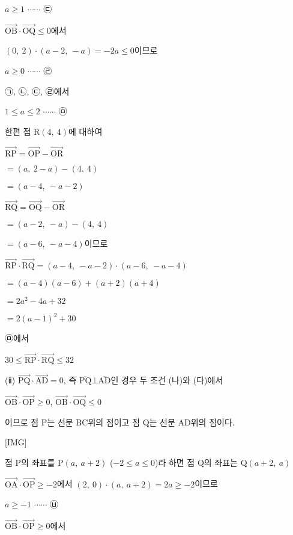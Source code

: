 \documentclass{oblivoir}
\begin{document}
$a\ge 1$ $\cdots\cdots$ ㉢

$\overrightarrow{\mathrm{OB}}\cdot\overrightarrow{\mathrm{OQ}}\le 0$에서 

$(0,\:2)\cdot(a-2,\:  - a)= -2a\le 0$이므로

$a\ge 0$ $\cdots\cdots$ ㉣

㉠, ㉡, ㉢, ㉣에서 

$1\le a\le 2$ $\cdots\cdots$ ㉤

한편 점 $\mathrm{R}(4,\: 4)$에 대하여

$\overrightarrow{\mathrm{RP}}$$=\overrightarrow{\mathrm{OP}} -\overrightarrow{\mathrm{OR}}$

$=(a,\:  2-a)-(4,\:  4)$

$=(a-4 ,\:  -a -2)$

$\overrightarrow{\mathrm{RQ}}$$=\overrightarrow{\mathrm{OQ}} -\overrightarrow{\mathrm{OR}}$

$=(a-2 ,\:  -a)-(4,\:  4)$

$=(a-6 ,\:  -a -4)$이므로

$\overrightarrow{\mathrm{RP}}\cdot\overrightarrow{\mathrm{RQ}}$$=(a-4 ,\:  -a -2)\cdot(a-6,\:  -a-4)$

$=(a-4)(a-6)+(a+2)(a+4)$

$= 2a^{2}- 4a + 32$

$= 2(a-1)^{2}+ 30$

㉤에서 

$30\le\overrightarrow{\mathrm{RP}}\cdot\overrightarrow{\mathrm{RQ}}\le 32$

(ⅱ) $\overrightarrow{\mathrm{PQ}}\cdot\overrightarrow{\mathrm{AD}} = 0$, 즉 $\overline{\mathrm{PQ}}\bot\overline{\mathrm{AD}}$인 경우 두 조건 (나)와 (다)에서 

$\overrightarrow{\mathrm{OB}}\cdot\overrightarrow{\mathrm{OP}}\ge 0$, $\overrightarrow{\mathrm{OB}}\cdot\overrightarrow{\mathrm{OQ}}\le 0$

이므로 점 $\mathrm{P}$는 선분 $\mathrm{BC}$위의 점이고 점 $\mathrm{Q}$는 선분 $\mathrm{AD}$위의 점이다.

[IMG]

점 $\mathrm{P}$의 좌표를 $\mathrm{P}(a ,\:  a+2)$ ($-2\le a\le 0$)라 하면 점 $\mathrm{Q}$의 좌표는 $\mathrm{Q}(a+2 ,\:  a)$

$\overrightarrow{\mathrm{OA}}\cdot\overrightarrow{\mathrm{OP}}\ge -2$에서 $(2,\:0)\cdot(a,\:a+2)=2a\ge -2$이므로

$a\ge -1$ $\cdots\cdots$ ㉥

$\overrightarrow{\mathrm{OB}}\cdot\overrightarrow{\mathrm{OP}}\ge 0$에서 
\end{document}

